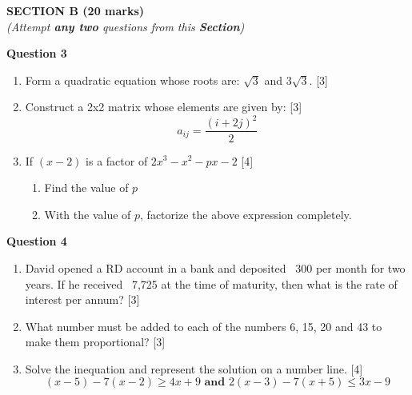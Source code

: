\newpage
\begin{center}
   \large
   \textbf{SECTION B (20 marks)}\\
   \vspace{5mm}
   \normalsize
   \textit{(Attempt \textbf{any two} questions from this \textbf{Section})}
\end{center}
\par

\noindent
\textbf{Question 3}
\begin{enumerate}[label=(\roman*)]

    \item Form a quadratic equation whose roots are: $\sqrt{3}$ and $3\sqrt{3}$. \hfill [3] 

    \item Construct a 2x2 matrix whose elements are given by: \hfill [3]
        \[
            a_{ij} = \frac{(i+2j)^2}{2}
        \]

    \item If $(x-2)$ is a factor of $2x^3 - x^2 - px - 2$ \hfill [4]
        \begin{enumerate}
            \item Find the value of $p$
            \item With the value of $p$, factorize the above expression completely.
        \end{enumerate}

\end{enumerate}

\noindent
\textbf{Question 4}
\begin{enumerate}[label=(\roman*)]

    \item David opened a RD account in a bank and deposited \rupee~300
        per month for two years. If he received \rupee~7,725 at the time 
        of maturity, then what is the rate of interest per annum? \hfill [3]

    \item What number must be added to each of the numbers 
        6, 15, 20 and 43 to make them proportional? \hfill [3]

    \item Solve the inequation and represent the solution on a number line. \hfill [4]
        \[
            (x-5) - 7(x-2) \geq 4x + 9 \textbf{ and } 2(x-3) - 7(x+5) \leq 3x-9
        \]

\end{enumerate}

